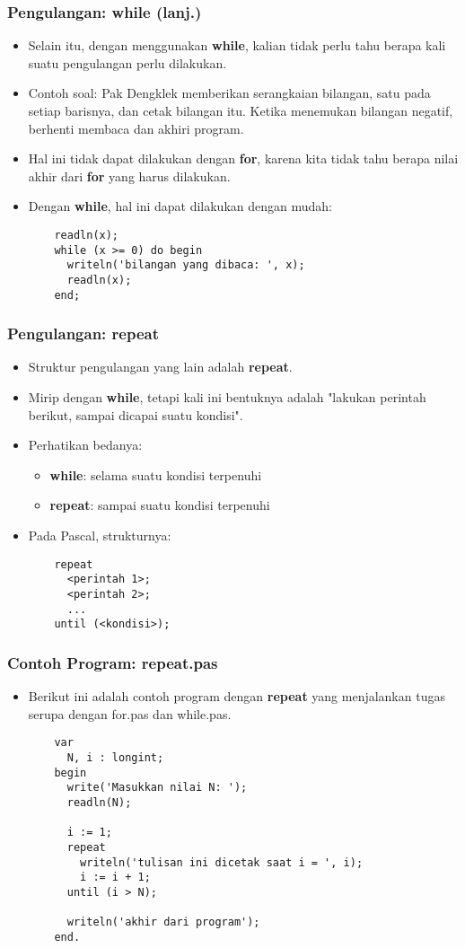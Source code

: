 \begin{frame}[fragile]
\frametitle{Pengulangan: while (lanj.)}
\begin{itemize}
  \item Selain itu, dengan menggunakan \textbf{while}, kalian tidak perlu tahu berapa kali suatu pengulangan perlu dilakukan.
  \item Contoh soal: Pak Dengklek memberikan serangkaian bilangan, satu pada setiap barisnya, dan cetak bilangan itu. Ketika menemukan bilangan negatif, berhenti membaca dan akhiri program.
  \item Hal ini tidak dapat dilakukan dengan \textbf{for}, karena kita tidak tahu berapa nilai akhir dari \textbf{for} yang harus dilakukan.
  \item Dengan \textbf{while}, hal ini dapat dilakukan dengan mudah:
  \begin{lstlisting}
    readln(x);
    while (x >= 0) do begin
      writeln('bilangan yang dibaca: ', x);
      readln(x);
    end;
  \end{lstlisting}
\end{itemize}
\end{frame}

\begin{frame}[fragile]
\frametitle{Pengulangan: repeat}
\begin{itemize}
  \item Struktur pengulangan yang lain adalah \textbf{repeat}.
  \item Mirip dengan \textbf{while}, tetapi kali ini bentuknya adalah "lakukan perintah berikut, sampai dicapai suatu kondisi".
  \item Perhatikan bedanya:
  \begin{itemize}
    \item \textbf{while}: selama suatu kondisi terpenuhi
    \item \textbf{repeat}: sampai suatu kondisi terpenuhi
  \end{itemize}
  \item Pada Pascal, strukturnya:
  \begin{lstlisting}
    repeat
      <perintah 1>;
      <perintah 2>;
      ...
    until (<kondisi>);
  \end{lstlisting}
\end{itemize}
\end{frame}

\begin{frame}[fragile]
\frametitle{Contoh Program: repeat.pas}
\begin{itemize}
  \item Berikut ini adalah contoh program dengan \textbf{repeat} yang menjalankan tugas serupa dengan for.pas dan while.pas.
  \begin{lstlisting}
    var
      N, i : longint;
    begin
      write('Masukkan nilai N: ');
      readln(N);

      i := 1;
      repeat
        writeln('tulisan ini dicetak saat i = ', i);
        i := i + 1;
      until (i > N);

      writeln('akhir dari program');
    end.
  \end{lstlisting}
\end{itemize}
\end{frame}

